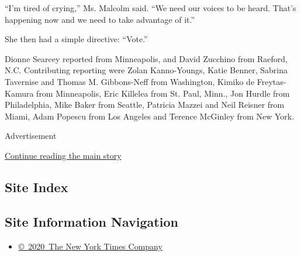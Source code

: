 ``I'm tired of crying,'' Ms. Malcolm said. ``We need our voices to be
heard. That's happening now and we need to take advantage of it.''

She then had a simple directive: ``Vote.''

Dionne Searcey reported from Minneapolis, and David Zucchino from
Raeford, N.C. Contributing reporting were Zolan Kanno-Youngs, Katie
Benner, Sabrina Tavernise and Thomas M. Gibbons-Neff from Washington,
Kimiko de Freytas-Kamura from Minneapolis, Eric Killelea from St. Paul,
Minn., Jon Hurdle from Philadelphia, Mike Baker from Seattle, Patricia
Mazzei and Neil Reisner from Miami, Adam Popescu from Los Angeles and
Terence McGinley from New York.

Advertisement

\protect\hyperlink{after-bottom}{Continue reading the main story}

\hypertarget{site-index}{%
\subsection{Site Index}\label{site-index}}

\hypertarget{site-information-navigation}{%
\subsection{Site Information
Navigation}\label{site-information-navigation}}

\begin{itemize}
\tightlist
\item
  \href{https://help.nytimes3xbfgragh.onion/hc/en-us/articles/115014792127-Copyright-notice}{©~2020~The
  New York Times Company}
\end{itemize}

